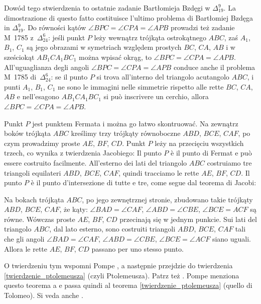 Dowód tego stwierdzenia to ostatnie zadanie Bartłomieja Bzdęgi w $\Delta_{19}^9$. %
La dimostrazione di questo fatto costituisce l'ultimo problema di Bartłomiej Bzdęga in $\Delta_{19}^9$. %
Do równości kątów $\angle BPC = \angle CPA = \angle APB$ prowadzi też zadanie M~1785 z~$\Delta_{24}^{6}$: jeśli punkt $P$ leży wewnątrz trójkąta ostrokątnego $ABC$, zaś $A_1$, $B_1$, $C_1$ są jego obrazami w symetriach względem prostych $BC$, $CA$, $AB$ i w sześciokąt $AB_1CA_1BC_1$ można wpisać okrąg, to $\angle BPC = \angle CPA = \angle APB$. %
All'uguaglianza degli angoli $\angle BPC = \angle CPA = \angle APB$ conduce anche il problema M~1785 di~$\Delta_{24}^{6}$: se il punto $P$ si trova all'interno del triangolo acutangolo $ABC$, i punti $A_1$, $B_1$, $C_1$ ne sono le immagini nelle simmetrie rispetto alle rette $BC$, $CA$, $AB$ e nell'esagono $AB_1CA_1BC_1$ si può inscrivere un cerchio, allora $\angle BPC = \angle CPA = \angle APB$. %

Punkt $P$ jest punktem Fermata i można go łatwo skontruować. %
Na zewnątrz boków trójkąta $ABC$ kreślimy trzy trójkąty równoboczne $ABD$, $BCE$, $CAF$, po czym prowadzimy proste $AE$, $BF$, $CD$. %
Punkt $P$ leży na przecięciu wszystkich trzech, co wynika z twierdzenia Jacobiego: %
Il punto $P$ è il punto di Fermat e può essere costruito facilmente. %
All'esterno dei lati del triangolo $ABC$ costruiamo tre triangoli equilateri $ABD$, $BCE$, $CAF$, quindi tracciamo le rette $AE$, $BF$, $CD$. %
Il punto $P$ è il punto d'intersezione di tutte e tre, come segue dal teorema di Jacobi: %

\begin{proposition}
    Na bokach trójkąta $ABC$, po jego zewnętrznej stronie, zbudowano takie trójkąty $ABD$, $BCE$, $CAF$, że kąty: $\angle BAD = \angle CAF$, $\angle ABD = \angle CBE$, $\angle BCE = ACF$ są równe. %
    Wówczas proste $AE$, $BF$, $CD$ przecinają się w jednym punkcie. %
    Sui lati del triangolo $ABC$, dal lato esterno, sono costruiti triangoli $ABD$, $BCE$, $CAF$ tali che gli angoli $\angle BAD = \angle CAF$, $\angle ABD = \angle CBE$, $\angle BCE = \angle ACF$ siano uguali. %
    Allora le rette $AE$, $BF$, $CD$ passano per uno stesso punto. %
\end{proposition}

O twierdzeniu tym wspomni Pompe \cite[s. 21]{pompe_2022}, a następnie przejdzie do twierdzenia \ref{twierdzenie_ptolemeusza} (czyli Ptolemeusza). %
Patrz też \cite[s. 33]{komisarczyk_2024}. %
Pompe menziona questo teorema a \cite[p. 21]{pompe_2022} e passa quindi al teorema \ref{twierdzenie_ptolemeusza} (quello di Tolomeo). %
Si veda anche \cite[p. 33]{komisarczyk_2024}. %

%